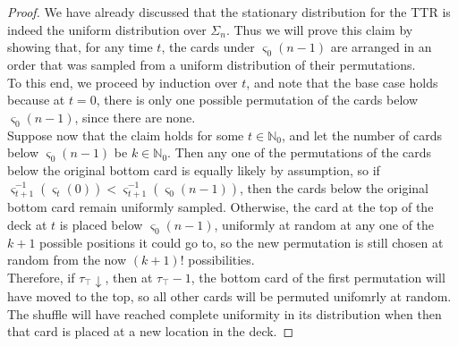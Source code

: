 		\begin{proof}
			We have already discussed that the stationary distribution for the TTR is
			indeed the uniform distribution over $\Sigma_n$. Thus we will prove this
			claim by showing that, for any time $t$, the cards under $\varsigma_0(n-1)$
			are arranged in an order that was sampled from a uniform distribution of 
			their permutations.\\
			To this end, we proceed by induction over $t$, and note that the base case 
			holds because at $t=0$, there is only one possible permutation of the cards
			below $\varsigma_0(n-1)$, since there are none.\\
			Suppose now that the claim holds for some $t \in\mathbb{N}_0$, and let the 
			number of cards below $\varsigma_0(n-1)$ be $k\in\mathbb{N}_0$. Then any 
			one of the permutations of the cards below the original bottom card is 
			equally likely by assumption, so if $\varsigma_{t+1}^{-1}(\varsigma_{t}(0))
			< \varsigma_{t+1}^{-1}(\varsigma_{0}(n-1))$, then the cards below the 
			original bottom card remain uniformly sampled. Otherwise, the card at the 
			top of the deck at $t$ is placed below $\varsigma_0(n-1)$, uniformly at 
			random at any one of the $k+1$ possible positions it could go to, so 
			the new permutation is still chosen at random from the now $(k+1)!$ 
			possibilities.\\
			Therefore, if $\tau_\top\downarrow$, then at $\tau_\top -1$, the
			bottom card of the first permutation will have moved to the top, so
			all other cards will be permuted unifomrly at random. The shuffle will have
			reached complete uniformity in its distribution when then that card is
			placed at a new location in the deck.
		\end{proof}
		\par

